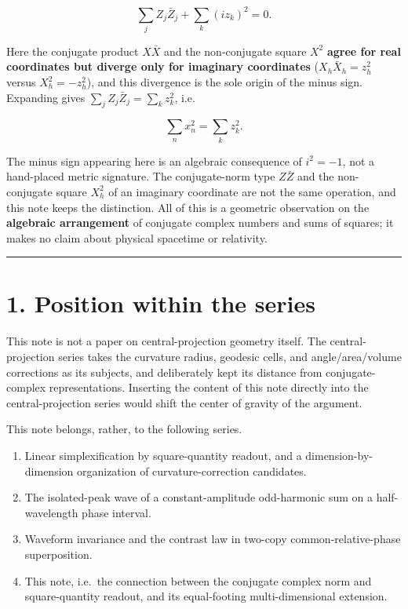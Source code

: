 \documentclass[11pt,a4paper]{article}
\providecommand{\tightlist}{\setlength{\itemsep}{0pt}\setlength{\parskip}{0pt}}
\begin{document}
\[
\sum_j Z_j\bar Z_j+\sum_k (i z_k)^2=0 .
\]

Here the conjugate product \(X\bar X\) and the non-conjugate square
\(X^2\) \textbf{agree for real coordinates but diverge only for
imaginary coordinates} (\(X_h\bar X_h=z_h^2\) versus \(X_h^2=-z_h^2\)),
and this divergence is the sole origin of the minus sign. Expanding
gives \(\sum_j Z_j\bar Z_j=\sum_k z_k^2\), i.e.

\[
\sum_n x_n^2=\sum_k z_k^2 .
\]

The minus sign appearing here is an algebraic consequence of \(i^2=-1\),
not a hand-placed metric signature. The conjugate-norm type \(Z\bar Z\)
and the non-conjugate square \(X_h^2\) of an imaginary coordinate are
not the same operation, and this note keeps the distinction. All of this
is a geometric observation on the \textbf{algebraic arrangement} of
conjugate complex numbers and sums of squares; it makes no claim about
physical spacetime or relativity.

\begin{center}\rule{0.5\linewidth}{0.5pt}\end{center}

\section{1. Position within the
series}\label{position-within-the-series}

This note is not a paper on central-projection geometry itself. The
central-projection series takes the curvature radius, geodesic cells,
and angle/area/volume corrections as its subjects, and deliberately kept
its distance from conjugate-complex representations. Inserting the
content of this note directly into the central-projection series would
shift the center of gravity of the argument.

This note belongs, rather, to the following series.

\begin{enumerate}
\def\labelenumi{\arabic{enumi}.}
\tightlist
\item
  Linear simplexification by square-quantity readout, and a
  dimension-by-dimension organization of curvature-correction
  candidates.
\item
  The isolated-peak wave of a constant-amplitude odd-harmonic sum on a
  half-wavelength phase interval.
\item
  Waveform invariance and the contrast law in two-copy
  common-relative-phase superposition.
\item
  This note, i.e.~the connection between the conjugate complex norm and
  square-quantity readout, and its equal-footing multi-dimensional
  extension.
\end{enumerate}
\end{document}
